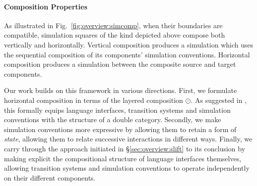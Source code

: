 \documentclass[acmsmall,screen,review,anonymous]{acmart}
\begin{document}
\paragraph{Composition Properties} %

As illustrated in Fig.~\ref{fig:overview:simcomp},
when their boundaries are compatible,
simulation squares of the kind depicted above compose both
vertically and horizontally.
Vertical composition produces a simulation
which uses the sequential composition
of its components' simulation conventions.
Horizontal composition produces a simulation
between the composite source and target components.

Our work builds on this framework in various directions.
First,
we formulate horizontal composition in terms of
the layered composition $\odot$.
As suggested in \citet{compcerto},
this formally equips language interfaces,
transition systems and
simulation conventions
with the structure of a double category.
Secondly,
we make simulation conventions more expressive
by allowing them to retain a form of \emph{state},
allowing them to relate successive interactions
in different ways.
Finally,
we carry through the approach initiated in \S\ref{sec:overview:slift}
to its conclusion
by making explicit the compositional structure of
language interfaces themselves,
allowing transition systems and simulation conventions
to operate independently on their different components.

\end{document}
